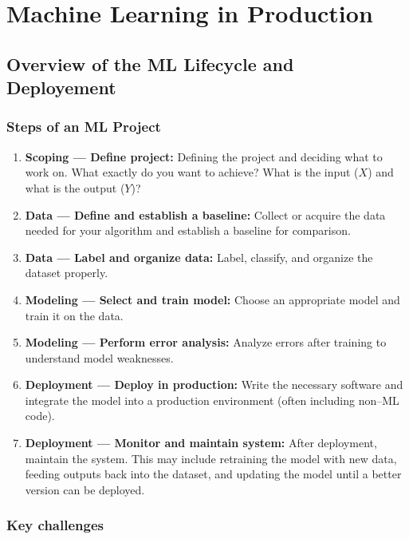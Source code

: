 \part{Machine Learning in Production}

\chapter{Overview of the ML Lifecycle and Deployement}

\section{Steps of an ML Project}

\begin{enumerate}
    \item \textbf{Scoping — Define project:} Defining the project and deciding what to work on. What exactly do you want to achieve? What is the input ($X$) and what is the output ($Y$)?

    \item \textbf{Data — Define and establish a baseline:} Collect or acquire the data needed for your algorithm and establish a baseline for comparison.

    \item \textbf{Data — Label and organize data:} Label, classify, and organize the dataset properly.

    \item \textbf{Modeling — Select and train model:} Choose an appropriate model and train it on the data.

    \item \textbf{Modeling — Perform error analysis:} Analyze errors after training to understand model weaknesses.

    \item \textbf{Deployment — Deploy in production:} Write the necessary software and integrate the model into a production environment (often including non–ML code).

    \item \textbf{Deployment — Monitor and maintain system:} After deployment, maintain the system. This may include retraining the model with new data, feeding outputs back into the dataset, and updating the model until a better version can be deployed.
\end{enumerate}

\section{Key challenges}

